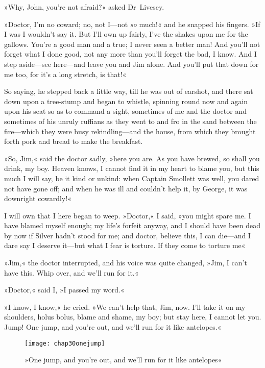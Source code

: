 »Why, John, you're not afraid?« asked Dr~Livesey.

»Doctor, I'm no coward; no, not I—not \textit{so} much!« and he snapped his fingers. »If I was I wouldn't say it. But I'll own up fairly, I've the shakes upon me for the gallows. You're a good man and a true; I never seen a better man! And you'll not forget what I done good, not any more than you'll forget the bad, I know. And I step aside—see here—and leave you and Jim alone. And you'll put that down for me too, for it's a long stretch, is that!«

So saying, he stepped back a little way, till he was out of earshot, and there sat down upon a tree-stump and began to whistle, spinning round now and again upon his seat so as to command a sight, sometimes of me and the doctor and sometimes of his unruly ruffians as they went to and fro in the sand between the fire—which they were busy rekindling—and the house, from which they brought forth pork and bread to make the breakfast.

»So, Jim,« said the doctor sadly, »here you are. As you have brewed, so shall you drink, my boy. Heaven knows, I cannot find it in my heart to blame you, but this much I will say, be it kind or unkind: when Captain Smollett was well, you dared not have gone off; and when he was ill and couldn't help it, by George, it was downright cowardly!«

I will own that I here began to weep. »Doctor,« I said, »you might spare me. I have blamed myself enough; my life's forfeit anyway, and I should have been dead by now if Silver hadn't stood for me; and doctor, believe this, I can die—and I dare say I deserve it—but what I fear is torture. If they come to torture me\longdash«

»Jim,« the doctor interrupted, and his voice was quite changed, »Jim, I can't have this. Whip over, and we'll run for it.«

»Doctor,« said I, »I passed my word.«

»I know, I know,« he cried. »We can't help that, Jim, now. I'll take it on my shoulders, holus bolus, blame and shame, my boy; but stay here, I cannot let you. Jump! One jump, and you're out, and we'll run for it like antelopes.«

\begin{figure}[p]
\centering
\texttt{[image: chap30onejump]}
\caption[»One jump, and we'll run for it«]{»One jump, and you're out, and we'll run for it like antelopes«}
\end{figure}  

